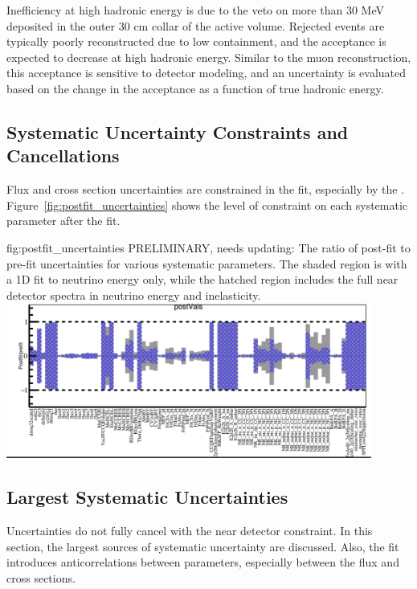Inefficiency at high hadronic energy is due to the veto on more than 30 MeV deposited in the outer 30 cm collar of the active volume. Rejected events are typically poorly reconstructed due to low containment, and the acceptance is expected to decrease at high hadronic energy. Similar to the muon reconstruction, this acceptance is sensitive to detector modeling, and an uncertainty is evaluated based on the change in the acceptance as a function of true hadronic energy.

\subsection{Systematic Uncertainty Constraints and Cancellations}

Flux and cross section uncertainties are constrained in the fit, especially by the . Figure~\ref{fig:postfit_uncertainties} shows the level of constraint on each systematic parameter after the fit.

\begin{dunefigure}{fig:postfit_uncertainties}
{PRELIMINARY, needs updating: The ratio of post-fit to pre-fit uncertainties for various systematic parameters. The shaded region is with a 1D  fit to neutrino energy only, while the hatched region includes the full \twod near detector spectra in neutrino energy and inelasticity.}
  \includegraphics[width=0.9\textwidth]{graphics/postfit_errors.png}
\end{dunefigure}



\subsection{Largest Systematic Uncertainties}

Uncertainties do not fully cancel with the near detector constraint. In this section, the largest sources of systematic uncertainty are discussed. Also, the fit introduces anticorrelations between parameters, especially between the flux and cross sections.

